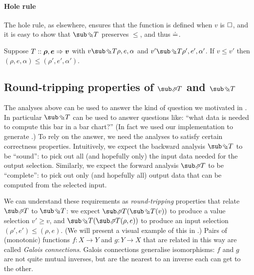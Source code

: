 \paragraph{Hole rule} The hole rule, as elsewhere, ensures that the function is defined when $v$ is $\square$, and it is easy to show that $\evalBwdF{T}$  preserves $\leq$, and thus $\doteq$.

\begin{lemma}
   Suppose $T :: \bm{\rho}, \bm{e} \Rightarrow \bm{v}$ with $v \evalBwdR{T} \rho, e, \alpha $ and $v' \evalBwdR{T} \rho', e', \alpha' $. If $v \leq v'$ then $(\rho, e, \alpha) \leq (\rho', e', \alpha')$.
\end{lemma}

\subsection{Round-tripping properties of $\evalFwdF{T}$ and $\evalBwdF{T}$}
\label{sec:data-dependencies:analysis:galois-connections}

The analyses above can be used to answer the kind of question we motivated in . In particular $\evalBwdF{T}$ can be used to answer questions like: ``what data is needed to compute this bar in a bar chart?'' (In fact we used our implementation to generate .) To rely on the answer, we need the analyses to satisfy certain correctness properties. Intuitively, we expect the backward analysis $\evalBwdF{T}$ to be ``sound'': to pick out all (and hopefully only) the input data needed for the output selection. Similarly, we expect the forward analysis $\evalFwdF{T}$ to be ``complete'': to pick out only (and hopefully all) output data that can be computed from the selected input. 

We can understand these requirements as \emph{round-tripping} properties that relate $\evalFwdF{T}$ to $\evalBwdF{T}$: we expect $\evalFwdF{T}(\evalBwdF{T}(v))$ to produce a value selection $v' \geq v$, and $\evalBwdF{T}(\evalFwdF{T}(\rho,e))$ to produce an input selection $(\rho',e') \leq (\rho,e)$. (We will present a visual example of this in .) Pairs of (monotonic) functions $f: X \to Y$ and $g: Y \to X$ that are related in this way are called \emph{Galois connections}. Galois connections generalise isomorphisms: $f$ and $g$ are not quite mutual inverses, but are the nearest to an inverse each can get to the other.

